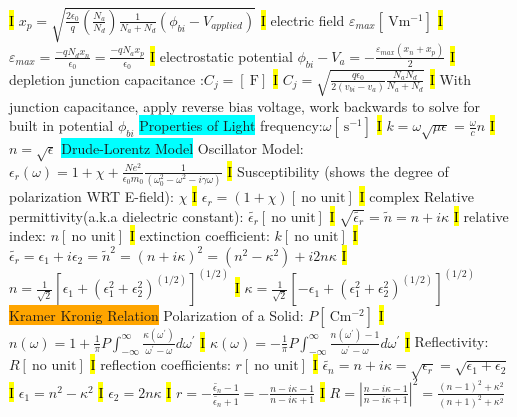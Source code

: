 \documentclass[fontsize=3]{scrartcl}
\begin{document}
\hl{I}
$x_p = \sqrt{ \frac{2 \epsilon_0}{q}(\frac{N_a}{N_d}) \frac{1}{N_a + N_d}(\phi_{bi} - V_{applied}) }$
\hl{I}
electric field $\varepsilon_{max}  [\SI{}{ \volt \meter^{-1}}]$
\hl{I}
$\varepsilon_{max} = \frac{-qN_d x_n}{\epsilon_0} = \frac{-qN_a x_p}{\epsilon_0}$
\hl{I}
electrostatic potential $\phi_{bi} - V_a = -\frac{\varepsilon_{max} (x_n + x_p)}{2}$
\hl{I}
depletion junction capacitance :$C_j = [\SI{} { \farad }] $
\hl{I}
$C_j = \sqrt{\frac{q \epsilon_0} { 2(v_{bi} - v_a) } \frac{N_a N_d}{N_a + N_d} }$
\hl{I}
With junction capacitance, apply reverse bias voltage, work backwards to solve for built in potential $\phi_{bi}$
\colorbox{Cyan}{Properties of Light}
frequency:$\omega [\SI{} { \second^{-1} }] $ 
\hl{I}
$k = \omega \sqrt{\mu \epsilon} = \frac{\omega}{c} n$
\hl{I}
$n = \sqrt{\epsilon}$
\colorbox{Cyan}{Drude-Lorentz Model}
Oscillator Model: $\epsilon_r(\omega) = 1 + \chi + \frac{Ne^2}{\epsilon_0 m_0} \frac{1}{(\omega_0^2 - \omega^2 - i \gamma \omega)}$
\hl{I}
Susceptibility (shows the degree of polarization WRT E-field): $\chi$ 
\hl{I}
$\epsilon_r = (1+\chi) [\SI{} {\text{no unit}}]$
\hl{I}
complex Relative permittivity(a.k.a dielectric constant): $\widetilde{\epsilon_r}  [\SI{} {\text{no unit}}] $ 
\hl{I}
$ \sqrt{ \widetilde{\epsilon_r} } = \widetilde{n} = n + i \kappa$
\hl{I}
relative index: $n  [\SI{} {\text{no unit}}] $ 
\hl{I}
extinction coefficient: $k  [\SI{} {\text{no unit}}] $ 
\hl{I}
$\widetilde{\epsilon_r}= \epsilon_1 + i\epsilon_2 = \widetilde{n}^2 = (n + i \kappa)^2 = (n^2 - \kappa^2) + i 2n\kappa$
\hl{I}
$n = \frac{1}{\sqrt{2} } [\epsilon_1 + (\epsilon_1^2 + \epsilon_2^2)^{(1/2)} ]^{(1/2)} $
\hl{I}
$\kappa = \frac{1}{\sqrt{2}} [-\epsilon_1 + (\epsilon_1^2 + \epsilon_2^2)^{(1/2)} ]^{(1/2)} $
\colorbox{Orange}{Kramer Kronig Relation}
Polarization of a Solid: $P  [\SI{} {\coulomb \meter^{-2}} ] $ 
\hl{I}
$n(\omega) = 1 + \frac{1}{\pi}P \int_{-\infty}^{\infty} \frac{\kappa(\omega^{\prime})}{\omega^{\prime} - \omega} d \omega^{\prime}$
\hl{I}
$\kappa(\omega) = - \frac{1}{\pi}P \int_{-\infty}^{\infty} \frac{n(\omega^{\prime}) - 1}{\omega^{\prime} - \omega} d \omega^{\prime}$
\hl{I}
Reflectivity: $R  [\SI{} {\text{no unit}}] $ 
\hl{I}
reflection coefficients: $r  [\SI{} {\text{no unit}}] $ 
\hl{I}
$\widetilde{\epsilon_n} = n + i\kappa = \sqrt{\epsilon_r} = \sqrt{\epsilon_1 + \epsilon_2}$
\hl{I}
$\epsilon_1 = n^2 - \kappa^2$
\hl{I}
$\epsilon_2 = 2n\kappa$
\hl{I}
$r = -\frac{\widetilde{\epsilon_n} - 1}{\widetilde{\epsilon_n} + 1} = -\frac{n-i\kappa - 1}{n-i\kappa + 1} $
\hl{I}
$R = |\frac{n-i\kappa - 1}{n-i\kappa + 1}|^2 = \frac{ (n - 1)^2 + \kappa^2 }{ (n + 1)^2 + \kappa^2 }$
\end{document}
